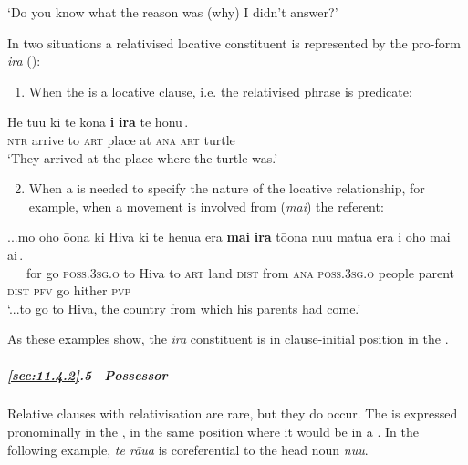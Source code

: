 \glt
‘Do you know what the reason was (why) I didn’t answer?’ \textstyleExampleref{[R363.109]} 
\z

In two situations a relativised locative constituent is represented by the pro-form \textit{ira} (): 

\begin{enumerate}
\item 
When the  is a locative clause, i.e. the relativised phrase is predicate:
\end{enumerate}

\ea\label{ex:11.100}
\gll He tu{\ꞌ}u ki te kona {\ob}\textbf{{\ꞌ}i} \textbf{ira} te honu\,{\cb}. \\
\textsc{ntr} arrive to \textsc{art} place {\db}at \textsc{ana} \textsc{art} turtle \\

\glt
‘They arrived at the place where the turtle was.’ \textstyleExampleref{[R532-03.008]}
\z

\begin{enumerate}
\setcounter{enumi}{1}
\item 
When a  is needed to specify the nature of the locative relationship, for example, when a movement is involved from (\textit{mai}) the referent:
\setcounter{enumi}{1}
\end{enumerate}

\ea\label{ex:11.101}
\gll ...mo oho ō{\ꞌ}ona ki Hiva ki te henua era {\ob}\textbf{mai} \textbf{ira} tō{\ꞌ}ona nu{\ꞌ}u matu{\ꞌ}a era i oho mai ai\,{\cb}. \\
~~~for go \textsc{poss.3sg.o} to Hiva to \textsc{art} land \textsc{dist} {\db}from \textsc{ana} \textsc{poss.3sg.o} people parent \textsc{dist} \textsc{pfv} go hither \textsc{pvp} \\

\glt
‘...to go to Hiva, the country from which his parents had come.’ \textstyleExampleref{[R370.002]} 
\z


As these examples show, the \textit{ira} constituent is in clause-initial position in the .

\subparagraph{\ref{sec:11.4.2}.5~ Possessor} Relative clauses with  relativisation are rare, but they do occur. The  is expressed pronominally in the , in the same position where it would be in a . In the following example, \textit{te rāua} is coreferential to the head noun \textit{nu{\ꞌ}u}.

